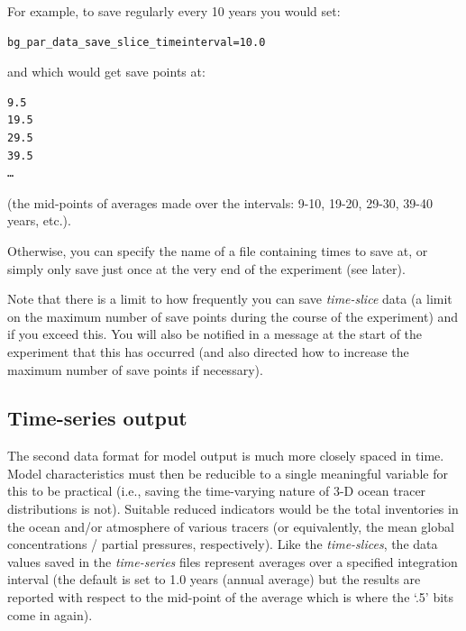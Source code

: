 \vspace{1mm}
For example, to save regularly every 10 years you would set:

\vspace{-1mm}\small\begin{verbatim}
bg_par_data_save_slice_timeinterval=10.0
\end{verbatim}\normalsize\vspace{-1mm}
and which would get save points at:

\vspace{-1mm}\footnotesize\begin{verbatim}
9.5
19.5
29.5
39.5
…
\end{verbatim}\normalsize\vspace{-1mm}
(the mid-points of averages made over the intervals: 9-10, 19-20, 29-30, 39-40 years, etc.).

\noindent Otherwise, you can specify the name of a file containing times to save at, or simply only save just once at the very end of the experiment (see later).

\vspace{1mm}
Note that there is a limit to how frequently you can save \textit{time-slice} data (a limit on the maximum number of save points during the course of the experiment) and if you exceed this. You will also be notified in a message at the start of the experiment that this has occurred (and also directed how to increase the maximum number of save points if necessary).

\newpage

\subsection{Time-series output}

The second data format for model output is much more closely spaced in time. Model characteristics must then be reducible to a single meaningful variable for this to be practical (i.e., saving the time-varying nature of 3-D ocean tracer distributions is not). Suitable reduced indicators would be the total inventories in the ocean and/or atmosphere of various tracers (or equivalently, the mean global concentrations / partial pressures, respectively). Like the \textit{time-slices}, the data values saved in the \textit{time-series} files represent averages over a specified integration interval (the default is set to 1.0 years (annual average) but the results are reported with respect to the mid-point of the average which is where the ‘.5’ bits come in again).

